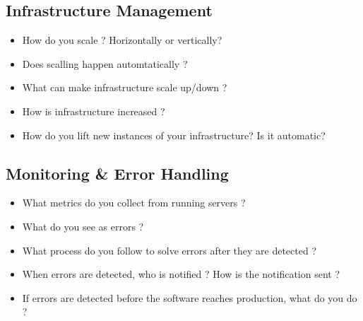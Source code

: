     \subsection*{Infrastructure Management}
        \begin{itemize}
            \item How do you scale ? Horizontally or vertically?
            \item Does scalling happen automtatically ?
            \item What can make infrastructure scale up/down ?
            \item How is infrastructure increased ?
            \item How do you lift new instances of your infrastructure? Is it automatic?
    \end{itemize}
    \subsection*{Monitoring \& Error Handling}
  	    \begin{itemize}
            \item What metrics do you collect from running servers ?
            \item What do you see as errors ?
            \item What process do you follow to solve errors after they are detected ?
            \item When errors are detected, who is notified ? How is the notification sent ?
            \item If errors are detected before the software reaches production, what do you do ?
        \end{itemize}
\pagebreak

